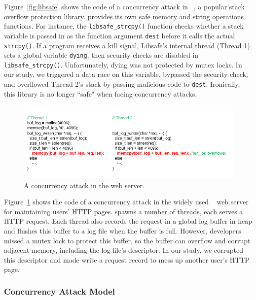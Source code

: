Figure~\ref{fig:libsafe} shows the code of a concurrency attack in 
\libsafe~\cite{libsafe}, a popular stack overflow protection library. \libsafe
provides its own safe memory and string operations functions. For instance, the 
\texttt{libsafe\_strcpy()} function checks whether a stack variable is passed 
in as the function argument \texttt{dest} before it calls the actual 
\texttt{strcpy()}. If a program receives a kill signal, Libsafe's internal 
thread (Thread 1) sets a global variable \texttt{dying}, then security checks 
are disabled in \texttt{libsafe\_strcpy()}. Unfortunately, \v{dying} was not 
protected by mutex locks. In our study, we triggered a data race on this 
variable, bypassed the security check, and overflowed Thread 2's stack by 
passing malicious code to \texttt{dest}. Ironically, this \libsafe library is 
no longer ``safe" when facing concurrency attacks.

\begin{figure}[h]
\centering
\includegraphics[width=0.8\columnwidth]{figures/apache}
\vspace{-.05in}
\caption{{A concurrency attack in the \apache web server.}} \label{fig:apache}
\vspace{-.15in}
\end{figure}

Figure~\ref{fig:apache} shows the code of a concurrency attack in 
the widely used \apache~\cite{apache} web server for maintaining users' HTTP 
pages. \apache 
spawns a number of threads, each serves a HTTP request. Each thread also 
records the request in a global log buffer in heap and flushes this buffer to a 
log file when the buffer is full. However, developers missed a mutex lock to 
protect this buffer, so the buffer can overflow and corrupt adjacent memory, 
including the log file's descriptor. In our study, we corrupted this descriptor 
and made \apache write a request record to mess up another user's HTTP page.



\vspace{-.15in}\subsubsection{Concurrency Attack Model} 
\label{sec:attack-phase}\vspace{-.075in}

